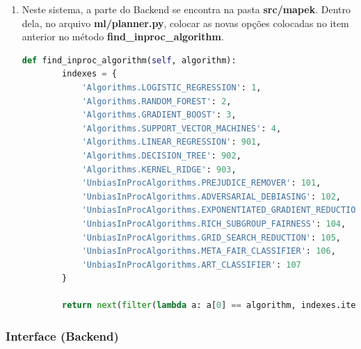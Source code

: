 \documentclass[portugues]{ic-tese}
\begin{document}
\begin{enumerate}
\item Neste sistema, a parte do Backend se encontra na pasta \textbf{src/mapek}. Dentro dela, no arquivo \textbf{ml/planner.py}, colocar as novas opções colocadas no item anterior no método \textbf{find\_inproc\_algorithm}.

\begin{lstlisting}[language=Python, label=cod:findInprocAlgorithm]
    def find_inproc_algorithm(self, algorithm):
        indexes = {
            'Algorithms.LOGISTIC_REGRESSION': 1,
            'Algorithms.RANDOM_FOREST': 2,
            'Algorithms.GRADIENT_BOOST': 3,
            'Algorithms.SUPPORT_VECTOR_MACHINES': 4,
            'Algorithms.LINEAR_REGRESSION': 901,
            'Algorithms.DECISION_TREE': 902,
            'Algorithms.KERNEL_RIDGE': 903,
            'UnbiasInProcAlgorithms.PREJUDICE_REMOVER': 101,
            'UnbiasInProcAlgorithms.ADVERSARIAL_DEBIASING': 102,
            'UnbiasInProcAlgorithms.EXPONENTIATED_GRADIENT_REDUCTION': 103,
            'UnbiasInProcAlgorithms.RICH_SUBGROUP_FAIRNESS': 104,
            'UnbiasInProcAlgorithms.GRID_SEARCH_REDUCTION': 105,
            'UnbiasInProcAlgorithms.META_FAIR_CLASSIFIER': 106,
            'UnbiasInProcAlgorithms.ART_CLASSIFIER': 107
        }

        return next(filter(lambda a: a[0] == algorithm, indexes.items()))[1]
\end{lstlisting}
\end{enumerate}

\subsubsection{Interface (Backend)}
\end{document}
